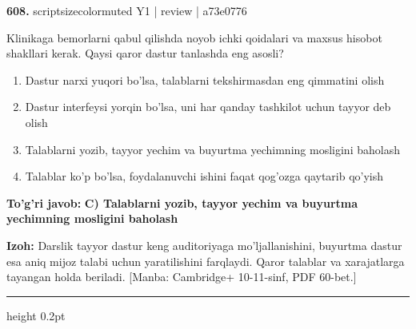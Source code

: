 \documentclass[10pt,a4paper]{article}
\begin{document}
{\bfseries\sffamily\color{ink} 608.} {scriptsizecolor{muted} Y1 | review | a73e0776}
\par
Klinikaga bemorlarni qabul qilishda noyob ichki qoidalari va maxsus hisobot shakllari kerak. Qaysi qaror dastur tanlashda eng asosli?
\begin{enumerate}[label=\Alph*),leftmargin=9mm]
\item Dastur narxi yuqori bo'lsa, talablarni tekshirmasdan eng qimmatini olish
\item Dastur interfeysi yorqin bo'lsa, uni har qanday tashkilot uchun tayyor deb olish
\item Talablarni yozib, tayyor yechim va buyurtma yechimning mosligini baholash
\item Talablar ko'p bo'lsa, foydalanuvchi ishini faqat qog'ozga qaytarib qo'yish
\end{enumerate}
\begin{tcolorbox}[enhanced,breakable,colback=teal!4,colframe=teal!60!black,boxrule=0.45pt,arc=1.2mm,left=2.7mm,right=2.7mm,top=1.8mm,bottom=1.8mm,before skip=2mm,after skip=2mm]
{\bfseries\sffamily\color{teal}To'g'ri javob:} \textbf{C) Talablarni yozib, tayyor yechim va buyurtma yechimning mosligini baholash}
\par\smallskip
{\bfseries Izoh:} Darslik tayyor dastur keng auditoriyaga mo'ljallanishini, buyurtma dastur esa aniq mijoz talabi uchun yaratilishini farqlaydi. Qaror talablar va xarajatlarga tayangan holda beriladi. [Manba: Cambridge+ 10-11-sinf, PDF 60-bet.]
\end{tcolorbox}
\vspace{2mm}\hrule height 0.2pt\vspace{3mm}
\end{document}
